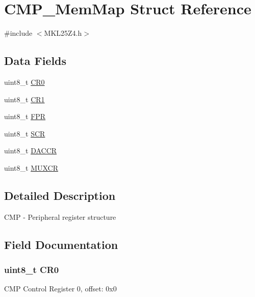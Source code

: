 \hypertarget{struct_c_m_p___mem_map}{}\section{C\+M\+P\+\_\+\+Mem\+Map Struct Reference}
\label{struct_c_m_p___mem_map}


{\ttfamily \#include $<$M\+K\+L25\+Z4.\+h$>$}

\subsection*{Data Fields}
\begin{DoxyCompactItemize}
\item 
uint8\+\_\+t \hyperlink{struct_c_m_p___mem_map_a2ae7fd9dd23ca10cb47550c1fc727440}{C\+R0}
\item 
uint8\+\_\+t \hyperlink{struct_c_m_p___mem_map_af9a269aaa5da5759c86b43f3cd68e208}{C\+R1}
\item 
uint8\+\_\+t \hyperlink{struct_c_m_p___mem_map_a190f8642b1bdc9d1252673a28b6b6df6}{F\+P\+R}
\item 
uint8\+\_\+t \hyperlink{struct_c_m_p___mem_map_aa43a01363ae5f82700d71abfd78b321d}{S\+C\+R}
\item 
uint8\+\_\+t \hyperlink{struct_c_m_p___mem_map_a51dd2d2a0528dfb19a45debc50dc8a51}{D\+A\+C\+C\+R}
\item 
uint8\+\_\+t \hyperlink{struct_c_m_p___mem_map_ae5069d9ba4618ae45636fcb5b2061169}{M\+U\+X\+C\+R}
\end{DoxyCompactItemize}


\subsection{Detailed Description}
C\+M\+P -\/ Peripheral register structure 

\subsection{Field Documentation}
\hypertarget{struct_c_m_p___mem_map_a2ae7fd9dd23ca10cb47550c1fc727440}{}
\subsubsection[{C\+R0}]{\setlength{\rightskip}{0pt plus 5cm}uint8\+\_\+t C\+R0}\label{struct_c_m_p___mem_map_a2ae7fd9dd23ca10cb47550c1fc727440}
C\+M\+P Control Register 0, offset\+: 0x0 \hypertarget{struct_c_m_p___mem_map_af9a269aaa5da5759c86b43f3cd68e208}{}
